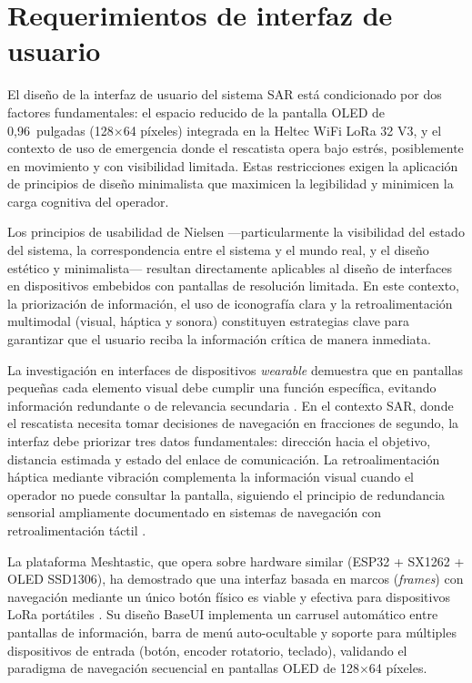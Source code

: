\section{Requerimientos de interfaz de usuario}\label{sec:req_ui}

El diseño de la interfaz de usuario del sistema SAR está condicionado por dos factores fundamentales: el espacio reducido de la pantalla OLED de 0,96~pulgadas (128$\times$64 píxeles) integrada en la Heltec WiFi LoRa 32 V3, y el contexto de uso de emergencia donde el rescatista opera bajo estrés, posiblemente en movimiento y con visibilidad limitada. Estas restricciones exigen la aplicación de principios de diseño minimalista que maximicen la legibilidad y minimicen la carga cognitiva del operador.

Los principios de usabilidad de Nielsen \cite{nielsen1994heuristic} ---particularmente la visibilidad del estado del sistema, la correspondencia entre el sistema y el mundo real, y el diseño estético y minimalista--- resultan directamente aplicables al diseño de interfaces en dispositivos embebidos con pantallas de resolución limitada. En este contexto, la priorización de información, el uso de iconografía clara y la retroalimentación multimodal (visual, háptica y sonora) constituyen estrategias clave para garantizar que el usuario reciba la información crítica de manera inmediata.

La investigación en interfaces de dispositivos \textit{wearable} demuestra que en pantallas pequeñas cada elemento visual debe cumplir una función específica, evitando información redundante o de relevancia secundaria \cite{gonzalez2017nielsen}. En el contexto SAR, donde el rescatista necesita tomar decisiones de navegación en fracciones de segundo, la interfaz debe priorizar tres datos fundamentales: dirección hacia el objetivo, distancia estimada y estado del enlace de comunicación. La retroalimentación háptica mediante vibración complementa la información visual cuando el operador no puede consultar la pantalla, siguiendo el principio de redundancia sensorial ampliamente documentado en sistemas de navegación con retroalimentación táctil \cite{amemiya2008haptic}.

La plataforma Meshtastic, que opera sobre hardware similar (ESP32 + SX1262 + OLED SSD1306), ha demostrado que una interfaz basada en marcos (\textit{frames}) con navegación mediante un único botón físico es viable y efectiva para dispositivos LoRa portátiles \cite{meshtastic2025baseui}. Su diseño BaseUI implementa un carrusel automático entre pantallas de información, barra de menú auto-ocultable y soporte para múltiples dispositivos de entrada (botón, encoder rotatorio, teclado), validando el paradigma de navegación secuencial en pantallas OLED de 128$\times$64 píxeles.


